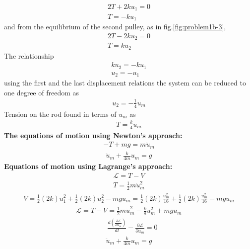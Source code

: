 \documentclass[]{report}
\begin{document}
\begin{eqnarray*}
2T+2ku_1=0\\
T=-ku_1
\end{eqnarray*}
and from the equilibrium of the second pulley, as in fig.\ref{fig:problem1b-3},
\begin{eqnarray*}
2T-2ku_2=0\\
T=k u_2
\end{eqnarray*}
The relationship
\begin{eqnarray*}
k u_2 =-k u_1 \\
u_2=-u_1
\end{eqnarray*}
using the first and the last displacement relations the system can be reduced to one degree of freedom as
\begin{eqnarray*}
u_2=-\frac{1}{4}u_m
\end{eqnarray*}
Tension on the rod found in terms of $u_m$ as
\begin{eqnarray*}
T=\frac{k}{4} u_m
\end{eqnarray*}
\textbf{The equations of motion using Newton's approach:}\\
\begin{eqnarray*}
-T+mg=m\ddot{u}_m
\end{eqnarray*}
\begin{eqnarray*}
\ddot{u}_m+\frac{k}{4m}u_m=g
\end{eqnarray*}
\textbf{Equations of motion using Lagrange's approach:}
\begin{eqnarray*}
\mathcal{L}=T-V
\end{eqnarray*}
\begin{eqnarray*}
T=\frac{1}{2} m \dot{u}_m^2
\end{eqnarray*}
\begin{eqnarray*}
V=\frac{1}{2}\left(2k\right)u_1^2+\frac{1}{2}\left(2k\right)u_2^2-mgu_m=\frac{1}{2}\left(2k\right)\frac{u_m^2}{16}+\frac{1}{2}\left(2k\right)\frac{u_m^2}{16}-mgu_m
\end{eqnarray*}
\begin{eqnarray*}
\mathcal{L}=T-V=\frac{1}{2}m \dot{u}_m^2-\frac{k}{8}u_m^2+mgu_m
\end{eqnarray*}
\begin{eqnarray*}
\quad \frac{d \left(\frac{\partial \mathcal{L}}{\partial \dot{u}_m}\right)}{dt} -\frac{\partial \mathcal{L}}{\partial {u}_m}=0
\end{eqnarray*}
\begin{eqnarray*}
\ddot{u}_m+\frac{k}{4m}u_m=g
\end{eqnarray*}
\end{document}
